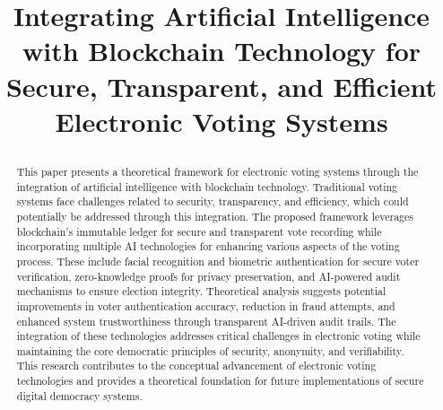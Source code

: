 \documentclass[conference]{IEEEtran}
\begin{document}
\title{Integrating Artificial Intelligence with Blockchain Technology for Secure, Transparent, and Efficient Electronic Voting Systems\\
{}

}

\author{
    \and
}

\maketitle

\begin{abstract}
This paper presents a theoretical framework for electronic voting systems through the integration of artificial intelligence with blockchain technology. Traditional voting systems face challenges related to security, transparency, and efficiency, which could potentially be addressed through this integration. The proposed framework leverages blockchain's immutable ledger for secure and transparent vote recording while incorporating multiple AI technologies for enhancing various aspects of the voting process. These include facial recognition and biometric authentication for secure voter verification, zero-knowledge proofs for privacy preservation, and AI-powered audit mechanisms to ensure election integrity. Theoretical analysis suggests potential improvements in voter authentication accuracy, reduction in fraud attempts, and enhanced system trustworthiness through transparent AI-driven audit trails. The integration of these technologies addresses critical challenges in electronic voting while maintaining the core democratic principles of security, anonymity, and verifiability. This research contributes to the conceptual advancement of electronic voting technologies and provides a theoretical foundation for future implementations of secure digital democracy systems.
\end{abstract}
\end{document}
